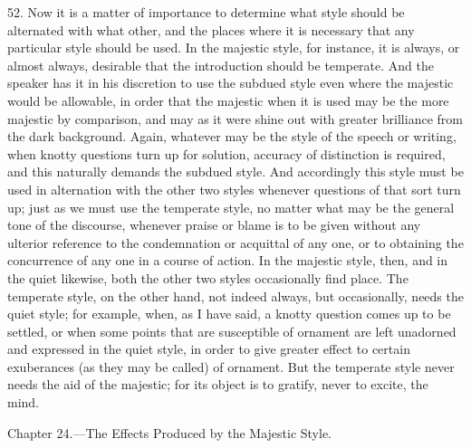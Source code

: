 52. Now it is a matter of importance to determine what style should be alternated with what other, and the places where it is necessary that any particular style should be used. In the majestic style, for instance, it is always, or almost always, desirable that the introduction should be temperate. And the speaker has it in his discretion to use the subdued style even where the majestic would be allowable, in order that the majestic when it is used may be the more majestic by comparison, and may as it were shine out with greater brilliance from the dark background. Again, whatever may be the style of the speech or writing, when knotty questions turn up for solution, accuracy of distinction is required, and this naturally demands the subdued style. And accordingly this style must be used in alternation with the other two styles whenever questions of that sort turn up; just as we must use the temperate style, no matter what may be the general tone of the discourse, whenever praise or blame is to be given without any ulterior reference to the condemnation or acquittal of any one, or to obtaining the concurrence of any one in a course of action. In the majestic style, then, and in the quiet likewise, both the other two styles occasionally find place. The temperate style, on the other hand, not indeed always, but occasionally, needs the quiet style; for example, when, as I have said, a knotty question comes up to be settled, or when some points that are susceptible of ornament are left unadorned and expressed in the quiet style, in order to give greater effect to certain exuberances (as they may be called) of ornament. But the temperate style never needs the aid of the majestic; for its object is to gratify, never to excite, the mind.


Chapter 24.—The Effects Produced by the Majestic Style.

